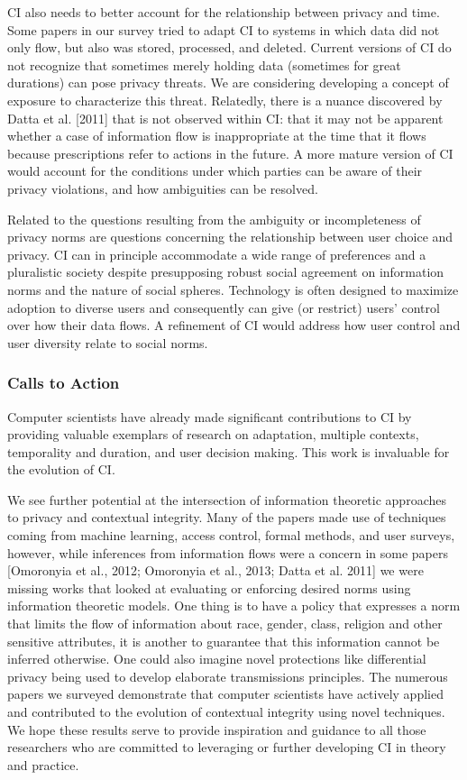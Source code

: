 \documentclass[../thesis.tex]{subfiles}
\begin{document}
CI also needs to better account for the relationship between privacy and
time. Some papers in our survey tried to adapt CI to systems in which
data did not only flow, but also was stored, processed, and
deleted.
Current versions of CI do not
recognize that sometimes merely holding data (sometimes for great
durations) can pose privacy threats. We are considering developing a
concept of exposure to characterize this threat. Relatedly, there is a
nuance discovered by Datta et al. [2011] that is not observed within
CI: that it may not be apparent whether a case of information flow is
inappropriate at the time that it flows because prescriptions refer to
actions in the future. A more mature version of CI would account for
the conditions under which parties can be aware of their privacy
violations, and how ambiguities can be resolved.

Related to the questions resulting from the ambiguity or incompleteness
of privacy norms are questions concerning the relationship between user
choice and privacy. CI can in principle accommodate a wide range of
preferences and a pluralistic society despite presupposing robust
social agreement on information norms and the nature of social spheres.
Technology is often designed to maximize adoption to diverse users and
consequently can give (or restrict) users' control over
how their data flows. A refinement of CI would address how user control
and user diversity relate to social norms.

\subsubsection{Calls to Action}
\label{CI5.4.2}

Computer scientists have already made significant contributions to CI by
providing valuable exemplars of research on adaptation, multiple
contexts, temporality and duration, and user decision making. This work
is invaluable for the evolution of CI.

We see further potential at the intersection of information theoretic
approaches to privacy and contextual integrity. Many of the papers made
use of techniques coming from machine learning, access control, formal
methods, and user surveys, however, while inferences from information
flows were a concern in some papers [Omoronyia et al., 2012; Omoronyia
et al., 2013; Datta et al. 2011] we were missing works that looked at
evaluating or enforcing desired norms using information theoretic
models. One thing is to have a policy that expresses a norm that limits
the flow of information about race, gender, class, religion and other
sensitive attributes, it is another to guarantee that this information
cannot be inferred otherwise. One could also imagine novel protections
like differential privacy being used to develop elaborate transmissions
principles. The numerous papers we surveyed demonstrate that computer
scientists have actively applied and contributed to the evolution of
contextual integrity using novel techniques. We hope these results
serve to provide inspiration and guidance to all those researchers who
are committed to leveraging or further developing CI in theory and
practice.
\end{document}

